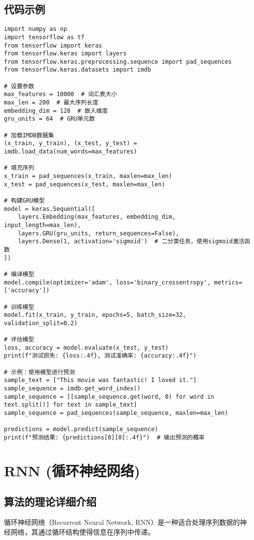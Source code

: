 \subsection*{代码示例}
\begin{lstlisting}
import numpy as np
import tensorflow as tf
from tensorflow import keras
from tensorflow.keras import layers
from tensorflow.keras.preprocessing.sequence import pad_sequences
from tensorflow.keras.datasets import imdb

# 设置参数
max_features = 10000  # 词汇表大小
max_len = 200  # 最大序列长度
embedding_dim = 128  # 嵌入维度
gru_units = 64  # GRU单元数

# 加载IMDB数据集
(x_train, y_train), (x_test, y_test) = imdb.load_data(num_words=max_features)

# 填充序列
x_train = pad_sequences(x_train, maxlen=max_len)
x_test = pad_sequences(x_test, maxlen=max_len)

# 构建GRU模型
model = keras.Sequential([
    layers.Embedding(max_features, embedding_dim, input_length=max_len),
    layers.GRU(gru_units, return_sequences=False),
    layers.Dense(1, activation='sigmoid')  # 二分类任务，使用sigmoid激活函数
])

# 编译模型
model.compile(optimizer='adam', loss='binary_crossentropy', metrics=['accuracy'])

# 训练模型
model.fit(x_train, y_train, epochs=5, batch_size=32, validation_split=0.2)

# 评估模型
loss, accuracy = model.evaluate(x_test, y_test)
print(f"测试损失: {loss:.4f}, 测试准确率: {accuracy:.4f}")

# 示例：使用模型进行预测
sample_text = ["This movie was fantastic! I loved it."]
sample_sequence = imdb.get_word_index()
sample_sequence = [[sample_sequence.get(word, 0) for word in text.split()] for text in sample_text]
sample_sequence = pad_sequences(sample_sequence, maxlen=max_len)

predictions = model.predict(sample_sequence)
print(f"预测结果: {predictions[0][0]:.4f}")  # 输出预测的概率

\end{lstlisting}


\section{RNN (循环神经网络)}
\subsection*{算法的理论详细介绍}
循环神经网络（Recurrent Neural Network, RNN）是一种适合处理序列数据的神经网络，其通过循环结构使得信息在序列中传递。

